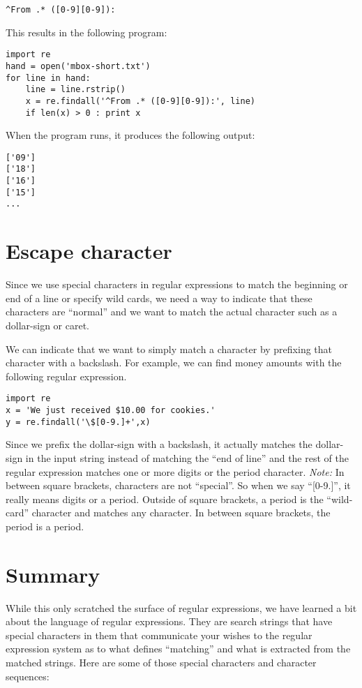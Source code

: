 \beforeverb
\begin{verbatim}
^From .* ([0-9][0-9]):
\end{verbatim}
\afterverb
%
This results in the following program:

\beforeverb
\begin{verbatim}
import re
hand = open('mbox-short.txt')
for line in hand:
    line = line.rstrip()
    x = re.findall('^From .* ([0-9][0-9]):', line)
    if len(x) > 0 : print x
\end{verbatim}
\afterverb
%
When the program runs, it produces the following output:

\beforeverb
\begin{verbatim}
['09']
['18']
['16']
['15']
...
\end{verbatim}
\afterverb
%
\section{Escape character}

Since we use special characters in regular expressions to match the beginning or end of 
a line or specify wild cards, we need a way to indicate that these characters are ``normal'' 
and we want to match the actual character such as a dollar-sign or caret.

We can indicate that we want to simply match a character by prefixing that character 
with a backslash.  For example, we can find money amounts with the following regular
expression.

\beforeverb
\begin{verbatim}
import re
x = 'We just received $10.00 for cookies.'
y = re.findall('\$[0-9.]+',x)
\end{verbatim}
\afterverb
%
Since we prefix the dollar-sign with a backslash, it actually matches the dollar-sign
in the input string instead of matching the ``end of line'' and the rest of the regular
expression matches one or more digits or the period character.  {\em Note:} In between 
square brackets, characters are not ``special''.   So when we say ``[0-9.]'', it really 
means digits or a period.    Outside of square brackets, a period is the ``wild-card'' 
character and matches any character.  In between square brackets, the period is a period.

\section{Summary}

While this only scratched the surface of regular expressions, we have learned a bit about the language of regular expressions.  They are search strings that have special characters in them that communicate your wishes to the regular expression system as to what defines ``matching'' and what is extracted from the matched strings.  Here are some of those special characters and character sequences:

